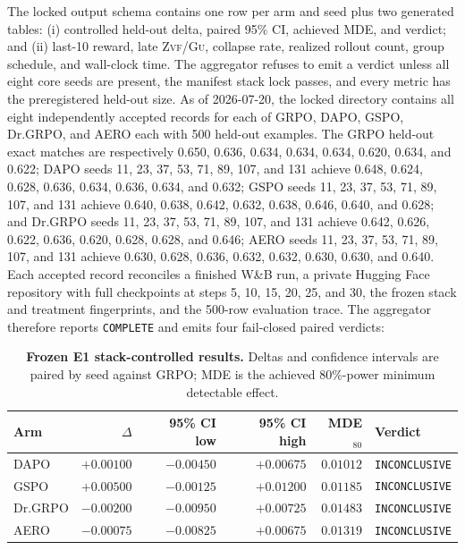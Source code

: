 \documentclass[11pt]{article}
\newcommand{\zvf}{\textsc{Zvf}}
\newcommand{\gu}{\textsc{Gu}}
\newcommand{\grpo}{\textsc{GRPO}}
\newcommand{\AuditDAPODelta}{+0.00100}
\newcommand{\AuditDAPOCILow}{-0.00450}
\newcommand{\AuditDAPOCIHigh}{+0.00675}
\newcommand{\AuditDAPOMDE}{0.01012}
\newcommand{\AuditDAPOVerdict}{INCONCLUSIVE}
\newcommand{\AuditGSPODelta}{+0.00500}
\newcommand{\AuditGSPOCILow}{-0.00125}
\newcommand{\AuditGSPOCIHigh}{+0.01200}
\newcommand{\AuditGSPOMDE}{0.01185}
\newcommand{\AuditGSPOVerdict}{INCONCLUSIVE}
\newcommand{\AuditDrGRPODelta}{-0.00200}
\newcommand{\AuditDrGRPOCILow}{-0.00950}
\newcommand{\AuditDrGRPOCIHigh}{+0.00725}
\newcommand{\AuditDrGRPOMDE}{0.01483}
\newcommand{\AuditDrGRPOVerdict}{INCONCLUSIVE}
\newcommand{\AuditAERODelta}{-0.00075}
\newcommand{\AuditAEROCILow}{-0.00825}
\newcommand{\AuditAEROCIHigh}{+0.00675}
\newcommand{\AuditAEROMDE}{0.01319}
\newcommand{\AuditAEROVerdict}{INCONCLUSIVE}
\begin{document}
The locked output schema contains one row per arm and seed plus two generated
tables: (i) controlled held-out delta, paired 95\% CI, achieved MDE, and verdict;
and (ii) last-10 reward, late \zvf/\gu{}, collapse rate, realized rollout count,
group schedule, and wall-clock time. The aggregator refuses to emit a verdict
unless all eight core seeds are present, the manifest stack lock passes, and
every metric has the preregistered held-out size. As of 2026-07-20, the locked
directory contains all eight independently accepted records for each of GRPO,
DAPO, GSPO, Dr.\grpo{}, and AERO
each with 500 held-out examples. The GRPO held-out exact matches are
respectively 0.650, 0.636, 0.634, 0.634, 0.634, 0.620, 0.634, and 0.622; DAPO
seeds 11, 23, 37, 53, 71, 89, 107, and 131 achieve 0.648, 0.624, 0.628, 0.636, 0.634,
0.636, 0.634, and 0.632; GSPO seeds 11, 23, 37, 53, 71, 89, 107, and 131 achieve 0.640,
0.638, 0.642, 0.632, 0.638, 0.646, 0.640, and 0.628; and Dr.\grpo{} seeds 11, 23, 37, 53, 71, 89, 107, and
131 achieve 0.642, 0.626, 0.622, 0.636, 0.620, 0.628, 0.628, and 0.646; AERO seeds 11, 23,
37, 53, 71, 89, 107, and 131 achieve 0.630, 0.628, 0.636, 0.632, 0.632, 0.630, 0.630, and 0.640. Each accepted
record reconciles a finished W\&B run, a private Hugging Face repository with
full checkpoints at steps 5, 10, 15, 20, 25, and 30, the frozen stack and
treatment fingerprints, and the 500-row evaluation trace. The aggregator
therefore reports \texttt{COMPLETE} and emits four fail-closed paired verdicts:

\begin{table}[t]
\centering
\caption{\textbf{Frozen E1 stack-controlled results.} Deltas and confidence
  intervals are paired by seed against GRPO; MDE is the achieved 80\%-power
  minimum detectable effect.}
\label{tab:e1-results}
\small
\begin{tabular}{@{}lrrrrl@{}}
\toprule
\textbf{Arm} & \textbf{$\Delta$} & \textbf{95\% CI low} &
\textbf{95\% CI high} & \textbf{MDE$_{80}$} & \textbf{Verdict} \\
\midrule
DAPO       & $\AuditDAPODelta$  & $\AuditDAPOCILow$  & $\AuditDAPOCIHigh$ & $\AuditDAPOMDE$ & \texttt{\AuditDAPOVerdict} \\
GSPO       & $\AuditGSPODelta$  & $\AuditGSPOCILow$  & $\AuditGSPOCIHigh$ & $\AuditGSPOMDE$ & \texttt{\AuditGSPOVerdict} \\
Dr.\grpo{} & $\AuditDrGRPODelta$ & $\AuditDrGRPOCILow$ & $\AuditDrGRPOCIHigh$ & $\AuditDrGRPOMDE$ & \texttt{\AuditDrGRPOVerdict} \\
AERO       & $\AuditAERODelta$ & $\AuditAEROCILow$ & $\AuditAEROCIHigh$ & $\AuditAEROMDE$ & \texttt{\AuditAEROVerdict} \\
\bottomrule
\end{tabular}
\end{table}
\end{document}
